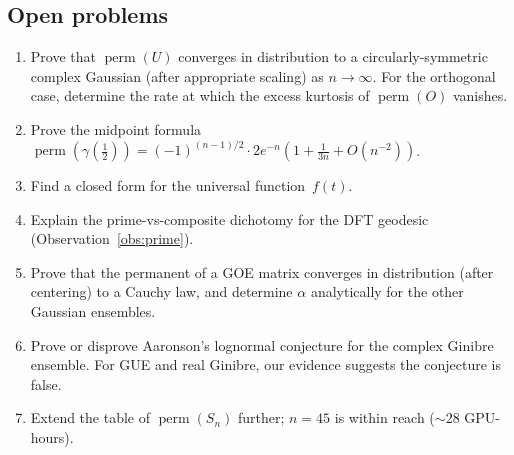 \documentclass[11pt]{amsart}
\theoremstyle{definition}
\theoremstyle{remark}
\DeclareMathOperator{\perm}{perm}
\begin{document}
\subsection{Open problems}

\begin{enumerate}
\item Prove that $\perm(U)$ converges in distribution to a
  circularly-symmetric complex Gaussian (after appropriate scaling) as
  $n\to\infty$.  For the orthogonal case, determine the rate at which
  the excess kurtosis of $\perm(O)$ vanishes.
\item Prove the midpoint formula
  $\perm(\gamma(\frac12))=(-1)^{(n-1)/2}\cdot 2e^{-n}(1+\frac{1}{3n}+O(n^{-2}))$.
\item Find a closed form for the universal function~$f(t)$.
\item Explain the prime-vs-composite dichotomy for the DFT geodesic
  (Observation~\ref{obs:prime}).
\item Prove that the permanent of a GOE matrix converges in
  distribution (after centering) to a Cauchy law, and determine
  $\alpha$ analytically for the other Gaussian ensembles.
\item Prove or disprove Aaronson's lognormal conjecture for the
  complex Ginibre ensemble.  For GUE and real Ginibre, our evidence
  suggests the conjecture is false.
\item Extend the table of $\perm(S_n)$ further; $n=45$ is within
  reach ($\sim\!28$ GPU-hours).
\end{enumerate}


\end{document}
